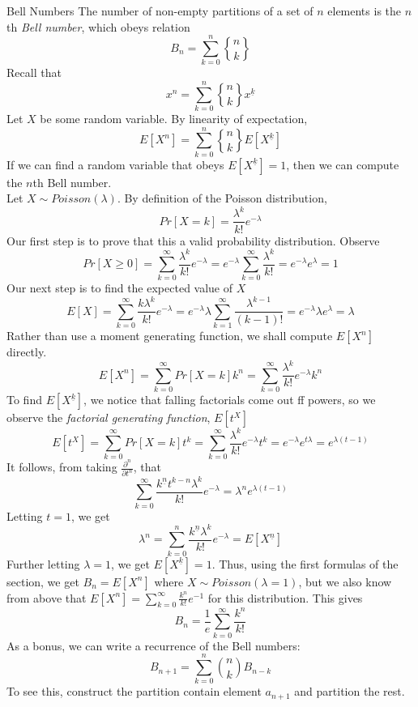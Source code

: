 \documentclass[11pt,twosided]{article}
\newcommand{\stirlingii}[2]{\genfrac{\{}{\}}{0pt}{}{#1}{#2}}
\newcommand{\fallingfactorial}[1]{^{\underline{#1}}}
\begin{document}
\begin{section}{Bell Numbers}
The number of non-empty partitions of a set of $n$ elements is the $n$th \emph{Bell number}, which obeys relation
$$B_n = \sum_{k=0}^n \stirlingii{n}{k}$$
Recall that
$$x^n = \sum_{k=0}^n \stirlingii{n}{k} x\fallingfactorial{k}$$
Let $X$ be some random variable. By linearity of expectation,
$$E[X^n] = \sum_{k=0}^n \stirlingii{n}{k}E[X\fallingfactorial{k}]$$
If we can find a random variable that obeys
$E[X\fallingfactorial{k}] = 1$, then we can compute the $n$th Bell number. \\
Let $X \sim Poisson(\lambda)$. By definition of the Poisson distribution,
$$Pr[X=k] = \frac{\lambda^k}{k!}e^{-\lambda}$$
Our first step is to prove that this a valid probability distribution. Observe
$$Pr[X\geq 0] = \sum_{k=0}^\infty \frac{\lambda^k}{k!}e^{-\lambda} = e^{-\lambda}\sum_{k=0}^\infty \frac{\lambda^k}{k!} = e^{-\lambda}e^\lambda = 1$$
Our next step is to find the expected value of $X$
$$E[X] = \sum_{k=0}^\infty \frac{k\lambda^k}{k!}e^{-\lambda} = e^{-\lambda}\lambda\sum_{k=1}^\infty \frac{\lambda^{k-1}}{(k-1)!} = e^{-\lambda}\lambda e^{\lambda} = \lambda$$
Rather than use a moment generating function, we shall compute $E[X^n]$ directly.
$$E[X^n] = \sum_{k=0}^\infty Pr[X=k]k^n = \sum_{k=0}^\infty \frac{\lambda^k}{k!}e^{-\lambda}k^n$$
To find $E[X\fallingfactorial{k}]$, we notice that falling factorials come out ff powers, so we observe the \emph{factorial generating function}, $E[t^X]$
$$E[t^X] = \sum_{k=0}^\infty Pr[X=k]t^k = \sum_{k=0}^\infty \frac{\lambda^k}{k!}e^{-\lambda}t^k = e^{-\lambda}e^{t\lambda} = e^{\lambda(t-1)}$$
It follows, from taking $\frac{\partial^n}{\partial t^n}$, that
$$\sum_{k=0}^\infty \frac{k\fallingfactorial{n} t^{k-n}\lambda^k}{k!}e^{-\lambda} = \lambda^n e^{\lambda(t-1)}$$
Letting $t=1$, we get
$$\lambda^n = \sum_{k=0}^n \frac{k\fallingfactorial{n}\lambda^k}{k!}e^{-\lambda} = E[X\fallingfactorial{n}]$$
Further letting $\lambda =1$, we get $E[X\fallingfactorial{k}] = 1$. Thus, using the first formulas of the section, we get $B_n = E[X^n]$ where $X\sim Poisson(\lambda=1)$, but we also know from above that $E[X^n] = \sum_{k=0}^\infty \frac{k^n}{k!}e^{-1}$ for this distribution. This gives
$$B_n = \frac{1}{e}\sum_{k=0}^\infty \frac{k^n}{k!}$$
As a bonus, we can write a recurrence of the Bell numbers:
$$B_{n+1} = \sum_{k=0}^n {n \choose k}B_{n-k}$$
To see this, construct the partition contain element $a_{n+1}$ and partition the rest.
\end{section}
\end{document}
